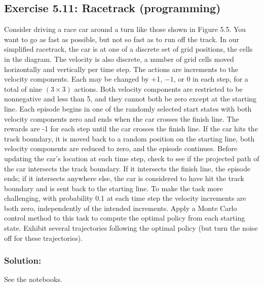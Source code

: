 \subsection*{Exercise 5.11: Racetrack (programming)}
Consider driving a race car around a turn
like those shown in Figure 5.5. You want to go as fast as possible, but not so fast as
to run off the track. In our simplified racetrack, the car is at one of a discrete set of
grid positions, the cells in the diagram. The velocity is also discrete, a number of grid
cells moved horizontally and vertically per time step. The actions are increments to the
velocity components. Each may be changed by +1, $-1$, or 0 in each step, for a total of
nine $(3 \times 3)$ actions. Both velocity components are restricted to be nonnegative and less
than 5, and they cannot both be zero except at the starting line. Each episode begins
in one of the randomly selected start states with both velocity components zero and
ends when the car crosses the finish line. The rewards are -1 for each step until the car
crosses the finish line. If the car hits the track boundary, it is moved back to a random
position on the starting line, both velocity components are reduced to zero, and the
episode continues. Before updating the car's location at each time step, check to see if
the projected path of the car intersects the track boundary. If it intersects the finish line,
the episode ends; if it intersects anywhere else, the car is considered to have hit the track
boundary and is sent back to the starting line. To make the task more challenging, with
probability 0.1 at each time step the velocity increments are both zero, independently of
the intended increments. Apply a Monte Carlo control method to this task to compute
the optimal policy from each starting state. Exhibit several trajectories following the
optimal policy (but turn the noise off for these trajectories).

\subsubsection*{Solution:}

See the notebooks.

